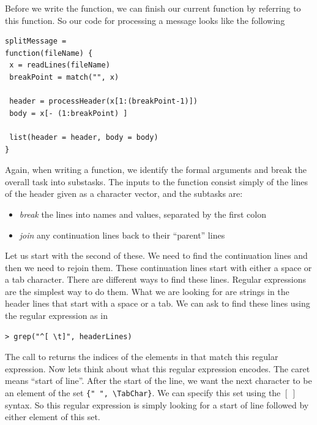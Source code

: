 Before we write the function, we can finish our 
current  function by referring 
to this  function.
So our code for processing a message looks like the following
\begin{verbatim}
splitMessage =
function(fileName) {
 x = readLines(fileName)
 breakPoint = match("", x)

 header = processHeader(x[1:(breakPoint-1)])
 body = x[- (1:breakPoint) ]

 list(header = header, body = body)
}
\end{verbatim}

Again, when writing a function, we identify the formal arguments
and break the overall task into substasks.  The inputs to the
function  consist simply
of the lines of the header given as a character vector,
and the subtasks are: 

\begin{itemize}
\item
\textit{break} the lines into 
names and values, separated by the first colon
\item
\textit{join} any continuation lines back to their ``parent''
lines
\end{itemize}

Let us start with the second of these.  We need to find the
continuation lines and then we need to rejoin them.  These
continuation lines start with either a space or a tab character.
There are different ways to find these lines.  Regular expressions are
the simplest way to do them.
What we are looking for are strings in the 
header lines that start with a space or a tab.
We can ask
to find these lines using the regular expression as in
\begin{verbatim}
> grep("^[ \t]", headerLines)
\end{verbatim}
The call to  returns the indices of the elements in 
that match this regular expression. 
Now lets think about what this regular expression encodes.
The caret means ``start of line''.  After the start of the line, we want the 
next character to be
an element of the set \verb+{" ", \TabChar}+.  
We can specify this set using the $[~ ]$ syntax.  
So this regular expression is simply looking for a start
of line followed by either element of this set. 

